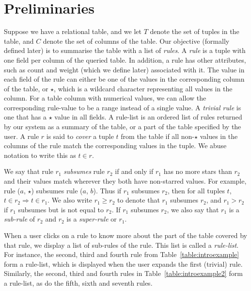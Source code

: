 \documentclass{sig-alternate}
\begin{document}
\section{Preliminaries} 
\label{sec:notation}
Suppose we have a relational table, and we let $T$ denote the set of tuples in the table, and $C$ denote the set of columns of the table. Our objective (formally defined later) is to summarise the table with a list of {\em rules}. A {\em rule} is a tuple with one field per column of the queried table. In addition, a rule has other attributes, such as count and weight (which we define later) associated with it. The value in each field of the rule can either be one of the values in the corresponding column of the table, or $\star$, which is a wildcard character representing all values in the column. For a table column with numerical values, we can allow the corresponding rule-value to be a range instead of a single value. A {\em trivial rule} is one that has a $\star$ value in all fields. A rule-list is an ordered list of rules returned by our system as a summary of the table, or a part of the table specified by the user. A rule $r$ is said to {\em cover} a tuple  $t$ from the table if all non-$\star$ values in the columns of the rule match the corresponding values in the tuple. We abuse notation to write this as $t \in r$.

We say that rule $r_1$ {\em subsumes} rule $r_2$ if and only if $r_1$ has no more stars than $r_2$ and their values match wherever they both have non-starred values. For example, rule ($a$, $\star$) subsumes rule ($a$, $b$). Thus if $r_1$ subsumes $r_2$, then for all tuples $t$, $t \in r_2 \Rightarrow t \in r_1$. We also write $r_1 \geq r_2$ to denote that $r_1$ subsumes $r_2$, and $r_1 > r_2$ if $r_1$ subsumes but is not equal to $r_2$. If $r_1$ subsumes $r_2$, we also say that $r_1$ is a {\em sub-rule} of $r_2$ and $r_2$ is a {\em super-rule} or $r_1$.

When a user clicks on a rule to know more about the part of the table covered by that rule, we display a list of sub-rules of the rule. This list is called a {\em rule-list}.
For instance, the second, third and fourth rule from Table~\ref{table:introexample} form a rule-list, which is displayed when the user expands the first (trivial) rule. Similarly, the second, third and fourth rules in Table~\ref{table:introexample2} form a rule-list, as do the fifth, sixth and seventh rules. 
\end{document}
